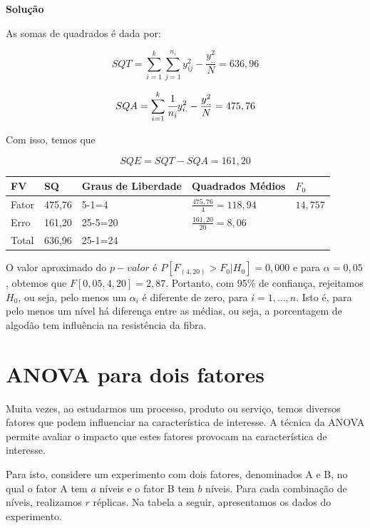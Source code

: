 \documentclass[
]{book}
\begin{document}
\textbf{Solução}

As somas de quadrados é dada por:

\[SQT=\sum^k_{i=1}\sum^{n_i}_{j=1}y_{ij}^{2}-\frac{y^{2}_{..}}{N}=636,96\]

\[SQA=\sum^k_{i=1}\cfrac{1}{n_i}y_{i.}^{2} -\frac{y^{2}_{..}}{N}= 475,76\]

Com isso, temos que

\[SQE=SQT-SQA= 161,20\]

\begin{longtable}[]{@{}lllll@{}}
\toprule
FV & SQ & Graus de Liberdade & Quadrados Médios & \(F_0\) \\
\midrule
\endhead
Fator & 475,76 & 5-1=4 & \(\frac{475,76}{4}=118,94\) & \(14,757\) \\
Erro & 161,20 & 25-5=20 & \(\frac{161,20}{20}=8,06\) & \\
Total & 636,96 & 25-1=24 & & \\
\bottomrule
\end{longtable}

O valor aproximado do \(p-valor\) é \(P[F_{(4,20)}> F_0|H_0]=0,000\) e para \(\alpha = 0,05\), obtemos que \(F[0,05, 4, 20]=2,87\). Portanto, com 95\% de confiança, rejeitamos \(H_0\), ou seja, pelo menos um \(\alpha_i\) é diferente de zero, para \(i=1,\ldots,n\). Isto é, para pelo menos um nível há diferença entre as médias, ou seja, a porcentagem de algodão tem influência na resistência da fibra.

\hypertarget{anova-para-dois-fatores}{%
\section{ANOVA para dois fatores}\label{anova-para-dois-fatores}}

Muita vezes, ao estudarmos um processo, produto ou serviço, temos diversos fatores que podem influenciar na característica de interesse. A técnica da ANOVA permite avaliar o impacto que estes fatores provocam na característica de interesse.

Para isto, considere um experimento com dois fatores, denominados A e B, no qual o fator A tem \(a\) níveis e o fator B tem \(b\) níveis. Para cada combinação de níveis, realizamos \(r\) réplicas. Na tabela a seguir, apresentamos os dados do experimento.
\end{document}
